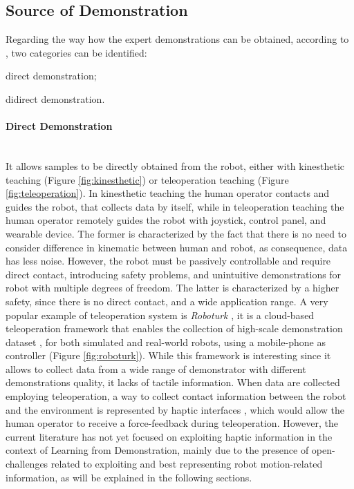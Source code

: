 \subsection{Source of Demonstration}
\label{sec:source_of_demonstration}
Regarding the way how the expert demonstrations can be obtained, according to \cite{fang2019survey}, two categories can be identified: \begin{enumerate*}[label=\textbf{(\alph*)}]
    \item direct demonstration; 
    \item didirect demonstration.
\end{enumerate*}

\paragraph{Direct Demonstration}  \mbox{} \\
\noindent It allows samples to be directly obtained from the robot, either with kinesthetic teaching (Figure \ref{fig:kinesthetic}) or teleoperation teaching (Figure \ref{fig:teleoperation}). In kinesthetic teaching the human operator contacts and guides the robot, that collects data by itself, while in teleoperation teaching the human operator remotely guides the robot with joystick, control panel, and wearable device. 
The former is characterized by the fact that there is no need to consider difference in kinematic between human and robot, as consequence, data has less noise. However, the robot must be passively controllable and require direct contact, introducing safety problems, and unintuitive demonstrations for robot with multiple degrees of freedom.
The latter is characterized by a higher safety, since there is no direct contact, and a wide application range.
A very popular example of teleoperation system is \textit{Roboturk} \cite{mandlekar2018roboturk}, it is a cloud-based teleoperation framework that enables the collection of high-scale demonstration dataset \cite{mandlekar2019scaling,mandlekar2022matters}, for both simulated and real-world robots, using a mobile-phone as controller (Figure \ref{fig:roboturk}). While this framework is interesting since it allows to collect data from a wide range of demonstrator with different demonstrations quality, it lacks of tactile information. When data are collected employing teleoperation, a way to collect contact information between the robot and the environment is represented by haptic interfaces \cite{cyberglove,touch}, which would allow the human operator to receive a force-feedback during teleoperation. However, the current literature has not yet focused on exploiting haptic information in the context of Learning from Demonstration, mainly due to the presence of open-challenges related to exploiting and best representing robot motion-related information, as will be explained in the following sections.

